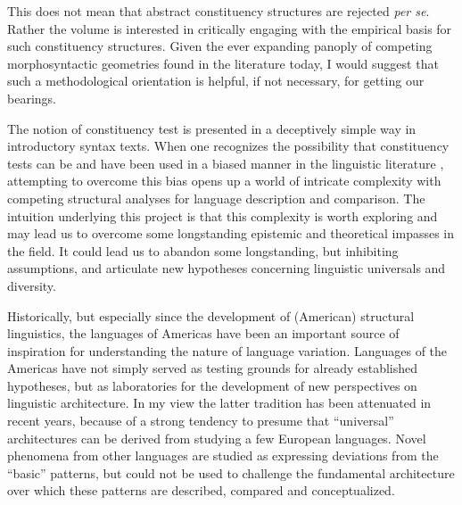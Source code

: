 \documentclass[output=paper,hidelinks]{langscibook}
\begin{document}
This does not mean that abstract constituency structures are rejected \textit{per se}. Rather the volume is interested in critically engaging with the empirical basis for such constituency structures. Given the ever expanding panoply of competing morphosyntactic geometries found in the literature today, I would suggest that such a methodological orientation is helpful, if not necessary, for getting our bearings. 

The notion of constituency test is presented in a deceptively simple way in introductory syntax texts. When one recognizes the possibility that constituency tests can be and have been used in a biased manner in the linguistic literature \citep{Croft2001, croft:tenunwarranted}, attempting to overcome this bias opens up a world of intricate complexity with competing structural analyses for language description and comparison. The intuition underlying this project is that this complexity is worth exploring and may lead us to overcome some longstanding epistemic and theoretical impasses in the field. It could lead us to abandon some longstanding, but inhibiting assumptions, and articulate new hypotheses concerning linguistic universals and diversity.

Historically, but especially since the development of (American) structural linguistics, the languages of Americas have been an important source of inspiration for understanding the nature of language variation. Languages of the Americas have not simply served as testing grounds for already established hypotheses, but as laboratories for the development of new perspectives on linguistic architecture. In my view the latter tradition has been attenuated in recent years, because of a strong tendency to presume that ``universal'' architectures can be derived from studying a few European languages. Novel phenomena from other languages are studied as expressing deviations from the ``basic'' patterns, but could not be used to challenge the fundamental architecture over which these patterns are described, compared and conceptualized.
\end{document}
